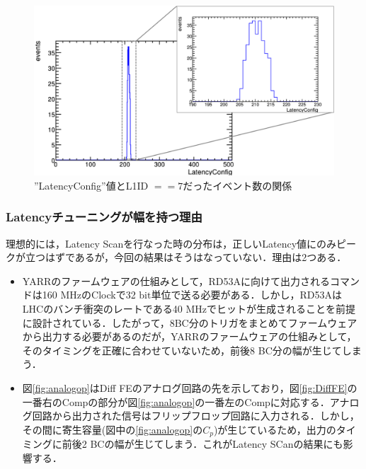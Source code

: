 \begin{figure}[h]
  \centering
  \includegraphics[width=14cm]{./figure/latencydist.png}
  \caption{''LatencyConfig''値とL1ID $== 7$だったイベント数の関係}
  \label{fig:latencydist}
\end{figure}


\subsubsection*{Latencyチューニングが幅を持つ理由}
理想的には，Latency Scanを行なった時の分布は，正しいLatency値にのみピークが立つはずであるが，今回の結果はそうはなっていない．理由は2つある．

\begin{itemize}
\item YARRのファームウェアの仕組みとして，RD53Aに向けて出力されるコマンドは160 $\mathrm{MHz}$のClockで32 $\mathrm{bit}$単位で送る必要がある．しかし，RD53AはLHCのバンチ衝突のレートである40 $\mathrm{MHz}$でヒットが生成されることを前提に設計されている．したがって，8BC分のトリガをまとめてファームウェアから出力する必要があるのだが，YARRのファームウェアの仕組みとして，そのタイミングを正確に合わせていないため，前後8 BC分の幅が生じてしまう．\\
  
\item 図\ref{fig:analogop}はDiff FEのアナログ回路の先を示しており，図\ref{fig:DiffFE}の一番右のCompの部分が図\ref{fig:analogop}の一番左のCompに対応する．アナログ回路から出力された信号はフリップフロップ回路に入力される．しかし，その間に寄生容量(図中の\ref{fig:analogop}の$C_p$)が生じているため，出力のタイミングに前後2 BCの幅が生じてしまう．これがLatency SCanの結果にも影響する．


\end{itemize}

